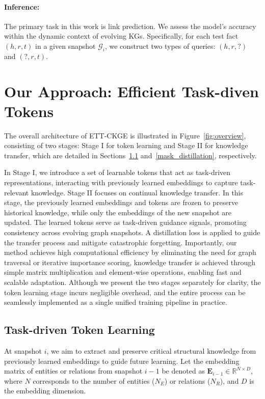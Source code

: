 \documentclass[runningheads]{llncs}
\begin{document}
\paragraph{\textbf{Inference}:} The primary task in this work is link prediction. We assess the model's accuracy within the dynamic context of evolving KGs. Specifically, for each test fact \((h, r, t)\) in a given snapshot \(\mathcal{G}_i\), we construct two types of queries: \((h, r, \textbf{?})\) and \((\textbf{?}, r, t)\).


\section{Our Approach: Efficient Task-diven Tokens}

The overall architecture of ETT-CKGE is illustrated in Figure~\ref{fig:overview}, consisting of two stages: Stage I for token learning and Stage II for knowledge transfer, which are detailed in Sections~\ref{task_learning} and~\ref{mask_distillation}, respectively. 

In Stage I, we introduce a set of learnable tokens that act as task-driven representations, interacting with previously learned embeddings to capture task-relevant knowledge. Stage II focuses on continual knowledge transfer. In this stage, the previously learned embeddings and tokens are frozen to preserve historical knowledge, while only the embeddings of the new snapshot are updated. The learned tokens serve as task-driven guidance signals, promoting consistency across evolving graph snapshots. A distillation loss is applied to guide the transfer process and mitigate catastrophic forgetting. Importantly, our method achieves high computational efficiency by eliminating the need for graph traversal or iterative importance scoring, knowledge transfer is achieved through simple matrix multiplication and element-wise operations, enabling fast and scalable adaptation. Although we present the two stages separately for clarity, the token learning stage incurs negligible overhead, and the entire process can be seamlessly implemented as a single unified training pipeline in practice.

\subsection{Task-driven Token Learning}
\label{task_learning}
At snapshot $i$, we aim to extract and preserve critical structural knowledge from previously learned embeddings to guide future learning. Let the embedding matrix of entities or relations from snapshot $i-1$ be denoted as $\mathbf{E}_{i-1} \in \mathbb{R}^{N \times D}$, where $N$ corresponds to the number of entities ($N_E$) or relations ($N_R$), and $D$ is the embedding dimension.
\end{document}
